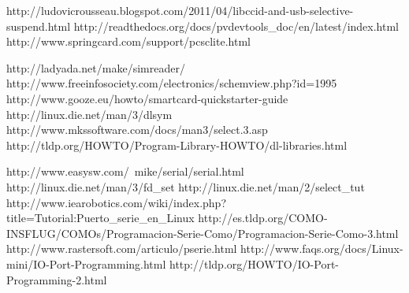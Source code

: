 \begin{thebibliography}{200}
\bibitem{} http://ludovicrousseau.blogspot.com/2011/04/libccid-and-usb-selective-suspend.html
\bibitem{} http://readthedocs.org/docs/pvdevtools\_doc/en/latest/index.html
\bibitem{} http://www.springcard.com/support/pcsclite.html


\bibitem{} http://ladyada.net/make/simreader/
\bibitem{} http://www.freeinfosociety.com/electronics/schemview.php?id=1995
\bibitem{} http://www.gooze.eu/howto/smartcard-quickstarter-guide
\bibitem{} http://linux.die.net/man/3/dlsym
\bibitem{} http://www.mkssoftware.com/docs/man3/select.3.asp
\bibitem{} http://tldp.org/HOWTO/Program-Library-HOWTO/dl-libraries.html


\bibitem{} http://www.easysw.com/~mike/serial/serial.html
\bibitem{} http://linux.die.net/man/3/fd\_set
\bibitem{} http://linux.die.net/man/2/select\_tut
\bibitem{} http://www.iearobotics.com/wiki/index.php?title=Tutorial:Puerto\_serie\_en\_Linux
\bibitem{} http://es.tldp.org/COMO-INSFLUG/COMOs/Programacion-Serie-Como/Programacion-Serie-Como-3.html
\bibitem{} http://www.rastersoft.com/articulo/pserie.html
\bibitem{} http://www.faqs.org/docs/Linux-mini/IO-Port-Programming.html
\bibitem{} http://tldp.org/HOWTO/IO-Port-Programming-2.html
\end{thebibliography}
